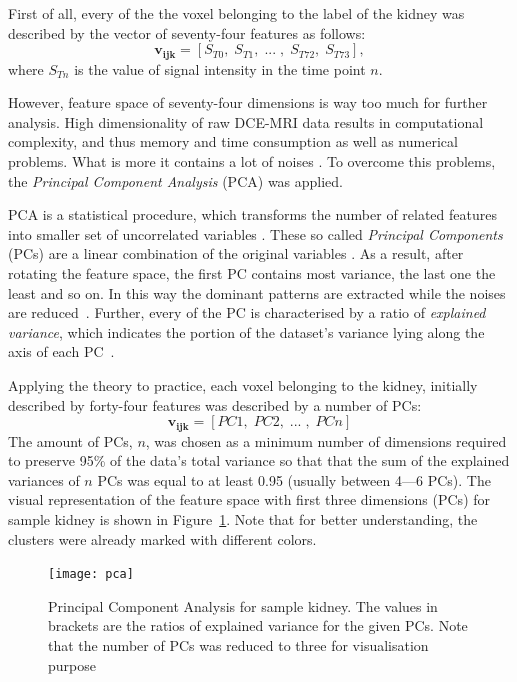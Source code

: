 First of all, every of the the voxel belonging to the label of the kidney was described by the vector of seventy-four features as follows:
\begin{equation}
\label{eq:voxel}
\mathbf{v_{ijk}} = [S_{T0},\; S_{T1},\;...\;,\; S_{T72},\; S_{T73}],
\end{equation}
where $S_{Tn}$ is the value of signal intensity in the time point $n$.

However, feature space of seventy-four dimensions is way too much for further analysis. High dimensionality of raw DCE-MRI data results in computational complexity, and thus memory and time consumption as well as numerical problems. What is more it contains a lot of noises \cite{KidneySubsegmentation}. To overcome this problems, the \textit{Principal Component Analysis} (PCA) \cite{wold1987principal} was applied.

PCA is a statistical procedure, which transforms the number of related features into smaller set of uncorrelated variables  \cite{pca}. These so called \textit{Principal Components} (PCs) are a linear combination of the original variables \cite{dunteman1989principal}. As a result, after rotating the feature space, the first PC contains most variance, the last one the least and so on. In this way the dominant patterns are extracted while the noises are reduced~\cite{wold1987principal}. Further, every of the PC is characterised by a ratio of \textit{explained variance}, which indicates the portion of the dataset’s variance lying along the axis of each PC~\cite{handson}.

Applying the theory to practice, each voxel belonging to the kidney, initially described by forty-four features was described by a number of PCs:
\begin{equation}
\label{eq:voxelpca}
\mathbf{v_{ijk}} = [PC1,\; PC2,\;...\;,\; PCn]  
\end{equation}
The amount of PCs, $n$, was chosen as a minimum number of dimensions required to preserve 95\% of the data's total variance so that that the sum of the explained variances of  $n$ PCs was equal to at least 0.95 (usually between 4---6 PCs). The visual representation of the feature space with first three dimensions (PCs) for sample kidney is shown in Figure~\ref{fig:pca_plot}. Note that for better understanding, the clusters were already marked with different colors. 

\begin{figure}[H]
		\centering
		\texttt{[image: pca]}
		\caption [Principal Component Analysis for sample kidney]{Principal Component Analysis for sample kidney. The values in brackets are the ratios of explained variance for the given PCs. Note that the number of PCs was reduced to three for visualisation purpose}
		\label{fig:pca_plot}
	\end{figure}

